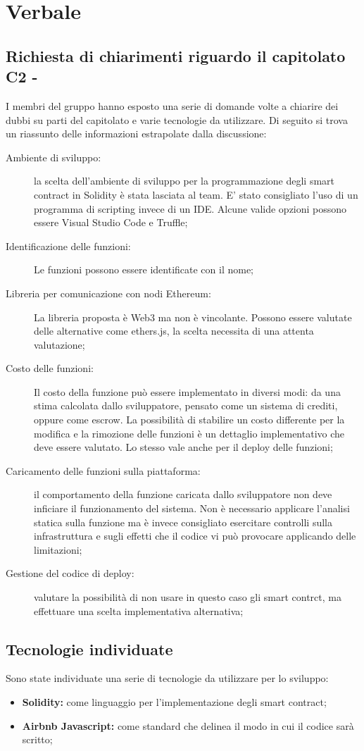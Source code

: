 \section{Verbale}
\subsection{Richiesta di chiarimenti riguardo il capitolato C2 - \NomeProgetto}
I membri del gruppo hanno esposto una serie di domande volte a chiarire dei dubbi su parti del capitolato e varie tecnologie da utilizzare.
Di seguito si trova un riassunto delle informazioni estrapolate dalla discussione:
\begin{description}
	\item[Ambiente di sviluppo:] la scelta dell'ambiente di sviluppo per la programmazione degli smart contract in Solidity è stata lasciata al team. E' stato consigliato l'uso di un programma di scripting invece di un IDE. Alcune valide opzioni possono essere Visual Studio Code e Truffle;
	\item[Identificazione delle funzioni:] Le funzioni possono essere identificate con il nome;
	\item[Libreria per comunicazione con nodi Ethereum:] La libreria proposta è Web3 ma non è vincolante. Possono essere valutate delle alternative come ethers.js, la scelta necessita di una attenta valutazione;
	\item[Costo delle funzioni:] Il costo della funzione può essere implementato in diversi modi: da una stima calcolata dallo sviluppatore, pensato come un sistema di crediti, oppure come escrow. La possibilità di stabilire un costo differente per la modifica e la rimozione delle funzioni è un  dettaglio implementativo che deve essere valutato. Lo stesso vale anche per il deploy delle funzioni;
	\item[Caricamento delle funzioni sulla piattaforma:] il comportamento della funzione caricata dallo sviluppatore non deve inficiare il funzionamento del sistema. Non è necessario applicare l'analisi statica sulla funzione ma è invece consigliato esercitare controlli sulla infrastruttura e sugli effetti che il codice vi può provocare applicando delle limitazioni;
	\item[Gestione del codice di deploy:] valutare la possibilità di non usare in questo caso gli smart contrct, ma effettuare una scelta implementativa alternativa;
\end{description}

\subsection{Tecnologie individuate}
Sono state individuate una serie di tecnologie da utilizzare per lo sviluppo:
\begin{itemize}
	\item \textbf{Solidity:} come linguaggio per l'implementazione degli smart contract;
	\item \textbf{Airbnb Javascript:} come standard che delinea il modo in cui il codice sarà scritto;
\end{itemize}
